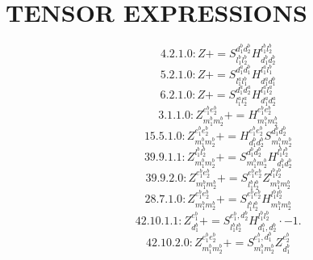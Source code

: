 \documentclass[letterpaper,10pt,fleqn,leqno,onecolumn]{article}
\begin{document}
\section{TENSOR EXPRESSIONS}
\begin{equation} \;\;\;\;\;\;  4.2.1.0: Z+=S^{d_{1}^{b}d_{2}^{b}}_{l_{1}^{b}l_{2}^{b}}H^{l_{1}^{b}l_{2}^{b}}_{d_{1}^{b}d_{2}^{b}} \end{equation}
\begin{equation} \;\;\;\;\;\;  5.2.1.0: Z+=S^{d_{1}^{a}d_{1}^{b}}_{l_{1}^{a}l_{1}^{b}}H^{l_{1}^{a}l_{1}^{b}}_{d_{1}^{a}d_{1}^{b}} \end{equation}
\begin{equation} \;\;\;\;\;\;  6.2.1.0: Z+=S^{d_{1}^{a}d_{2}^{a}}_{l_{1}^{a}l_{2}^{a}}H^{l_{1}^{a}l_{2}^{a}}_{d_{1}^{a}d_{2}^{a}} \end{equation}
\begin{equation} \;\;\;\;\;\;  3.1.1.0: Z^{e_{1}^{b}e_{2}^{b}}_{m_{1}^{b}m_{2}^{b}}+=H^{e_{1}^{b}e_{2}^{b}}_{m_{1}^{b}m_{2}^{b}} \end{equation}
\begin{equation} \;\;\;\;\;\;  15.5.1.0: Z^{e_{1}^{b}e_{2}^{b}}_{m_{1}^{b}m_{2}^{b}}+=H^{e_{1}^{b}e_{2}^{b}}_{d_{1}^{b}d_{2}^{b}}S^{d_{1}^{b}d_{2}^{b}}_{m_{1}^{b}m_{2}^{b}} \end{equation}
\begin{equation} \;\;\;\;\;\;  39.9.1.1: Z^{l_{1}^{b}l_{2}^{b}}_{m_{1}^{b}m_{2}^{b}}+=S^{d_{1}^{b}d_{2}^{b}}_{m_{1}^{b}m_{2}^{b}}H^{l_{1}^{b}l_{2}^{b}}_{d_{1}^{b}d_{2}^{b}} \end{equation}
\begin{equation} \;\;\;\;\;\;  39.9.2.0: Z^{e_{1}^{b}e_{2}^{b}}_{m_{1}^{b}m_{2}^{b}}+=S^{e_{1}^{b}e_{2}^{b}}_{l_{1}^{b}l_{2}^{b}}Z^{l_{1}^{b}l_{2}^{b}}_{m_{1}^{b}m_{2}^{b}} \end{equation}
\begin{equation} \;\;\;\;\;\;  28.7.1.0: Z^{e_{1}^{b}e_{2}^{b}}_{m_{1}^{b}m_{2}^{b}}+=S^{e_{1}^{b}e_{2}^{b}}_{l_{1}^{b}l_{2}^{b}}H^{l_{1}^{b}l_{2}^{b}}_{m_{1}^{b}m_{2}^{b}} \end{equation}
\begin{equation} \;\;\;\;\;\;  42.10.1.1: Z^{e_{1}^{b}}_{d_{1}^{b}}+=S^{e_{1}^{b},d_{2}^{b}}_{l_{1}^{b}l_{2}^{b}}H^{l_{1}^{b}l_{2}^{b}}_{d_{1}^{b},d_{2}^{b}}\cdot -1. \end{equation}
\begin{equation} \;\;\;\;\;\;  42.10.2.0: Z^{e_{1}^{b}e_{2}^{b}}_{m_{1}^{b}m_{2}^{b}}+=S^{e_{1}^{b},d_{1}^{b}}_{m_{1}^{b}m_{2}^{b}}Z^{e_{2}^{b}}_{d_{1}^{b}} \end{equation}
\end{document}
